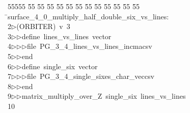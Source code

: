 %
%
\begin{tabbing}
55555 \= 55 \= 55 \= 55 \= 55 \= 55 \= 55 \= 55 \= 55 \= 55 \= 55 \= 55 \= 55 \= \>surface\_4\_0\_multiply\_half\_double\_six\_vs\_lines:\\[0pt]
2\>$\triangleright$\>(ORBITER)\ v\ 3\ \\[0pt]
3\>$\triangleright$\>$\triangleright$\>define\ lines\_vs\_lines\ vector\ \\[0pt]
4\>$\triangleright$\>$\triangleright$\>$\triangleright$\>file\ PG\_3\_4\_lines\_vs\_lines\_incmacsv\ \\[0pt]
5\>$\triangleright$\>$\triangleright$\>end\ \\[0pt]
6\>$\triangleright$\>$\triangleright$\>define\ single\_six\ vector\ \\[0pt]
7\>$\triangleright$\>$\triangleright$\>$\triangleright$\>file\ PG\_3\_4\_single\_sixes\_char\_veccsv\ \\[0pt]
8\>$\triangleright$\>$\triangleright$\>end\ \\[0pt]
9\>$\triangleright$\>$\triangleright$\>matrix\_multiply\_over\_Z\ single\_six\ lines\_vs\_lines\\[0pt]
10\>\end{tabbing}

